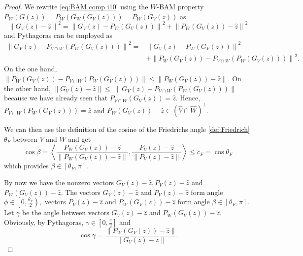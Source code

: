 \documentclass[smallextended,numbook,nospthms]{svjour3}
\theoremstyle{plain}
\theoremstyle{definition}
\begin{document}
\begin{proof}
	We rewrite \cref{eq:BAM comp i10} using the $W$-BAM property $P_{W}(G(z))=P_{W}\left(G_{W}\left(G_{V}(z)\right)\right)=P_{W}\left(G_{V}(z)\right)$ as
	\begin{equation}\label{eq:BAM comp ii13}
		\left\|G_{V}(z)-\hat{z}\right\|^{2}=\left\|G_{V}(z)-P_{W}\left(G_{V}(z)\right)\right\|^{2}+\left\|P_{W}\left(G_{V}(z)\right)-\hat{z}\right\|^{2}
	\end{equation}
	and Pythagoras can be employed as
	\begin{align}
		\left\|G_{V}(z)-P_{V \cap W}\left(P_{W}\left(G_{V}(z)\right)\right)\right\|^{2} =&\left\|G_{V}(z)-P_{W}\left(G_{V}(z)\right)\right\|^{2} \\
		&+\left\|P_{W}\left(G_{V}(z)\right)-P_{V \cap W}\left(P_{W}\left(G_{V}(z)\right)\right)\right\|^{2}. \label{eq:BAM comp ii14}
	\end{align}
	On the one hand, $\left\|P_{W}\left(G_{V}(z)\right)-P_{V \cap W}\left(P_{W}\left(G_{V}(z)\right)\right)\right\| \leq\left\|P_{W}\left(G_{V}(z)\right)-\hat{z}\right\| .$ On the other hand, $\left\|G_{V}(z)-\hat{z}\right\| \leq$
	$\left\|G_{V}(z)-P_{V \cap W}\left(P_{W}\left(G_{V}(z)\right)\right)\right\|$ because we have already seen that $P_{V \cap W}\left(G_{V}(z)\right)=\hat{z}$. Hence, $P_{V \cap W}\left(P_{W}\left(G_{V}(z)\right)\right)=\hat{z}$
	and $P_{W}\left(G_{V}(z)\right)-\hat{z} \in(\hat{V} \cap \hat{W})^{\perp}$.
	
	We can then use the definition of the cosine of the Friedrichs angle \cref{def:Friedrich} $\theta_{F}$ between $V$ and $W$ and get
	\begin{equation}\label{eq:BAM comp ii15}
		\cos\beta = \left\langle\frac{P_{W}\left(G_{V}(z)\right)-\hat{z}}{\left\|P_{W}\left(G_{V}(z)\right)-\hat{z}\right\|}, \frac{P_{V}(z)-\hat{z}}{\left\|P_{V}(z)-\hat{z}\right\|}\right\rangle \leq c_{F}=\cos \theta_{F}
	\end{equation}
	which provides $\beta \in\left[\theta_{F}, \pi\right]$.
	
	By now we have the nonzero vectors $G_{V}(z)-\hat{z}, P_{V}(z)-\hat{z}$ and $P_{W}\left(G_{V}(z)\right)-\hat{z} .$ The vectors $G_{V}(z)-\hat{z}$ and $P_{V}(z)-\hat{z}$ form angle $\phi \in\left[0, \frac{\theta_{F}}{2}\right),$ vectors $P_{V}(z)-\hat{z}$ and $P_{W}\left(G_{V}(z)\right)-\hat{z}$ form angle $\beta \in\left[\theta_{F}, \pi\right] .$ Let $\gamma$ be the angle between vectors $G_{V}(z)-\hat{z}$ and $P_{W}\left(G_{V}(z)\right)-\hat{z} .$ Obviously, by Pythagoras, $\gamma \in\left[0, \frac{\pi}{2}\right]$ and
	\begin{equation}\label{eq:BAM comp ii16}
	\cos\gamma=\frac{\left\|P_{W}\left(G_{V}(z)\right)-\hat{z}\right\|}{\left\|G_{V}(z)-\hat{z}\right\|}
	\end{equation}


\end{proof}
\end{document}
